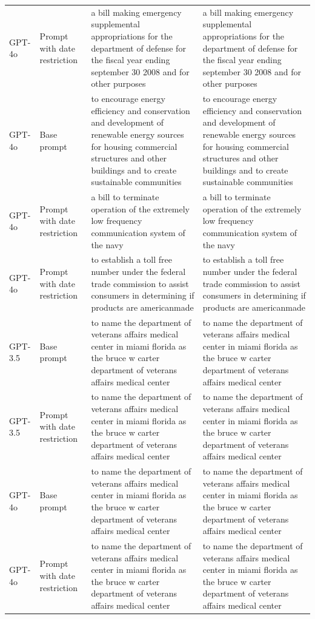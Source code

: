 \begin{longtable}{>{\raggedright\arraybackslash}p{1.4cm}>{\raggedright\arraybackslash}p{1.4cm}>{\raggedright\arraybackslash}p{5.5cm}>{\raggedright\arraybackslash}p{5.5cm}}
GPT-4o & Prompt with date restriction & a bill making emergency supplemental appropriations for the department of defense for the fiscal year ending september 30 2008 and for other purposes & a bill making emergency supplemental appropriations for the department of defense for the fiscal year ending september 30 2008 and for other purposes\\
GPT-4o & Base prompt & to encourage energy efficiency and conservation and development of renewable energy sources for housing commercial structures and other buildings and to create sustainable communities & to encourage energy efficiency and conservation and development of renewable energy sources for housing commercial structures and other buildings and to create sustainable communities\\
GPT-4o & Prompt with date restriction & a bill to terminate operation of the extremely low frequency communication system of the navy & a bill to terminate operation of the extremely low frequency communication system of the navy\\
GPT-4o & Prompt with date restriction & to establish a toll free number under the federal trade commission to assist consumers in determining if products are americanmade & to establish a toll free number under the federal trade commission to assist consumers in determining if products are americanmade\\
GPT-3.5 & Base prompt & to name the department of veterans affairs medical center in miami florida as the bruce w carter department of veterans affairs medical center & to name the department of veterans affairs medical center in miami florida as the bruce w carter department of veterans affairs medical center\\
GPT-3.5 & Prompt with date restriction & to name the department of veterans affairs medical center in miami florida as the bruce w carter department of veterans affairs medical center & to name the department of veterans affairs medical center in miami florida as the bruce w carter department of veterans affairs medical center\\
GPT-4o & Base prompt & to name the department of veterans affairs medical center in miami florida as the bruce w carter department of veterans affairs medical center & to name the department of veterans affairs medical center in miami florida as the bruce w carter department of veterans affairs medical center\\
GPT-4o & Prompt with date restriction & to name the department of veterans affairs medical center in miami florida as the bruce w carter department of veterans affairs medical center & to name the department of veterans affairs medical center in miami florida as the bruce w carter department of veterans affairs medical center\\

\end{longtable}
